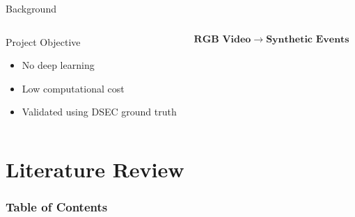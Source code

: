 \documentclass[10pt,xcolor=x11names,compress]{beamer}
\begin{document}
\begin{frame}{Background}
\begin{columns}[T]
\begin{block}{Project Objective}
      \begin{itemize}
      \item No deep learning
      \item Low computational cost
      \item Validated using DSEC ground truth
      \end{itemize}

    \end{block}

    \vspace{0.4cm}

    \begin{center}
      \Large
      \[
        \boxed{\textbf{RGB Video}\;\rightarrow\;\textbf{Synthetic Events}}
      \]
    \end{center}

  \end{columns}



\end{frame}

\section{Literature Review}

\begin{frame}
  \frametitle{\textbf{Table of Contents}}
  \tableofcontents[
  hideallsubsections=false
  sectionstyle=show/shaded,    
  subsectionstyle=show/shaded/hide, 
  section=1-100                
  ]
\end{frame}
\end{document}
